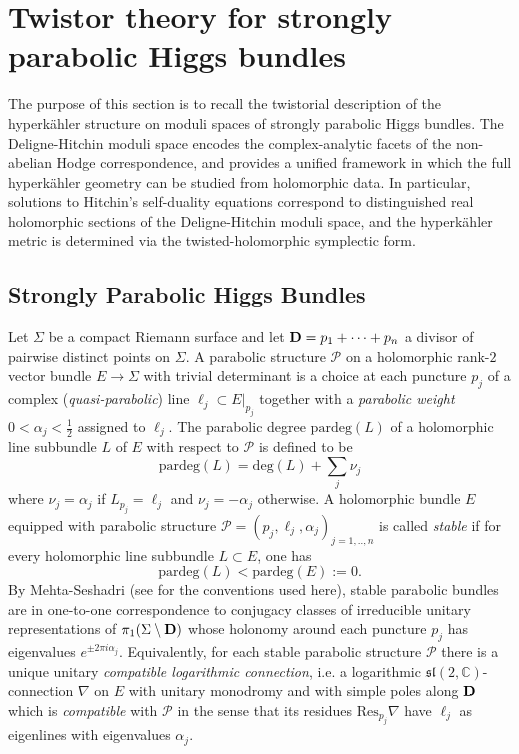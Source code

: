 \documentclass[12pt,a4paper]{amsart}
\theoremstyle{definition}
\theoremstyle{remark}
\newcommand{\C}{\mathbb C}
\newcommand{\Res}{\mathrm{Res}}
\newcommand{\Pcal}{\mathcal P}
\begin{document}
\section{Twistor theory for strongly parabolic Higgs bundles}\label{sec:twis}
The purpose of this section is to recall the twistorial description of the hyperk\"ahler
structure on moduli spaces of strongly parabolic Higgs bundles.
The Deligne-Hitchin moduli space 
encodes the complex-analytic facets of the non-abelian Hodge correspondence,
and
provides a unified framework in which the full hyperk\"ahler
geometry can be studied from holomorphic data.
In particular, solutions to Hitchin's self-duality equations correspond to distinguished
real holomorphic sections of the Deligne-Hitchin moduli space, and the hyperk\"ahler metric
is determined  via the twisted-holomorphic symplectic form.



\subsection{Strongly Parabolic Higgs Bundles}\label{sec:parahiggs}

Let $\Sigma$ be a compact Riemann surface and let ${\bf D} = p_1 + \cdots + p_n$ a divisor of
pairwise distinct points on $\Sigma$. 
A parabolic structure $\Pcal$  on a holomorphic rank-$2$ vector bundle 
$E\to \Sigma$ with trivial determinant is a choice at each puncture $p_j$ of a 
complex 
({\em quasi-parabolic}) line $\ell_j \subset E|_{{p_j}}$ together with a \emph{parabolic weight}
$0 < \alpha_j < \tfrac{1}{2}$  assigned to $\ell_j$.  
The parabolic degree $\mathrm{pardeg}(L)$  of a holomorphic line subbundle $L$ of $E$ with respect to $\Pcal$
is defined to be \[\mathrm{pardeg}(L)=\mathrm{deg}(L)+\sum_j\nu_j\]
where $\nu_j=\alpha_j$ if $L_{p_j}=\ell_j$ and $\nu_j=-\alpha_j$ otherwise.
A holomorphic bundle $E$ equipped with parabolic structure $\Pcal = (p_j,\ell_j,\alpha_j)_{j=1,..,n}$ is called {\em stable} if for every holomorphic line subbundle $L \subset E$, one has 
\begin{equation}\label{eq:slopestab}\mathrm{pardeg}(L) < \mathrm{pardeg}(E):=0.\end{equation}
By  Mehta-Seshadri  \cite{MeS} (see \cite{AW98, BY99} for the conventions used here), stable parabolic bundles are in one-to-one correspondence to conjugacy classes of irreducible unitary representations of $\pi_1(\Sigma\setminus {\bf D})$ whose holonomy around each puncture $p_j$ has eigenvalues $e^{\pm 2\pi i \alpha_j}$. Equivalently, for each stable parabolic structure $\Pcal$ there is a unique unitary \emph{compatible logarithmic connection}, i.e. a logarithmic $\mathfrak{sl}(2,\C)$-connection $\nabla$ on $E$ with unitary monodromy and with simple poles along ${\bf D}$ which is {\em compatible} with $\Pcal$ in the sense that 
 its  residues $\Res_{p_j}\nabla$ 
have $\ell_j$ as eigenlines with eigenvalues $\alpha_j$. 
\end{document}
